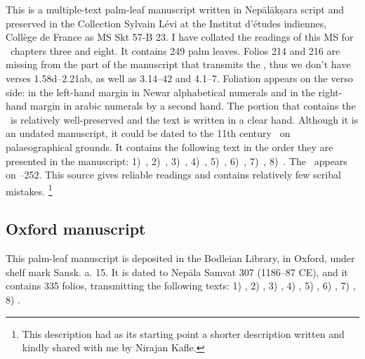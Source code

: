 This is a multiple-text palm-leaf manuscript written in 
Nepālā\-kṣara script and preserved in the 
Collection Sylvain Lévi at the Institut d'études
indiennes, Collège de France as MS Skt 57-B 23. 
I have collated the readings of this MS for \VSS\ 
chapters three and eight.
It contains 249 palm leaves. %
Folios 214 and 216 are missing from the 
part of the manuscript that transmits the \VSS,
thus we don't have verses 1.58d--2.21ab, as well as
3.14--42 and 4.1--7.
Foliation appears on the verso side: 
in the left-hand margin in
Newar alphabetical numerals and in 
the right-hand margin 
in arabic numerals by a second hand. 
The portion that contains the \VSS\ is 
relatively well-preserved and
the text is written in a clear hand. Although it is an undated manuscript, it could be dated to the 11th century \CE\ on palaeographical grounds. 
It contains the following text in the order they are presented in the manuscript:
1)~\SDhS, %
2)~\SDhU, %
3)~\SDhSangr, %
4)~\Ums, %
5)~\SivaUp, %
6)~\Uums, %
7)~\Vss, %
8)~\DharmP. %
The \VSS\ appears on --252.
This source gives reliable readings and contains
relatively few scribal mistakes.%
	\footnote{This description had as its starting 
	point a shorter description written and kindly
			          shared with me by Nirajan Kafle.}








\medskip
\subsection{Oxford manuscript}

This palm-leaf manuscript is deposited in the Bodleian Library, in Oxford, 
under shelf mark %
Sansk. a. 15. It is dated to Nepāla Samvat 307 (1186--87 CE),
and it contains 335 folios, transmitting the following texts: 
1) \SDhS, %
2) \SDhU,
3) \SDhSangr, %
4) \Ums, %
5) \SivaUp, %
6) \Uums, %
7) \Vss, %
8) \DharmP. %

